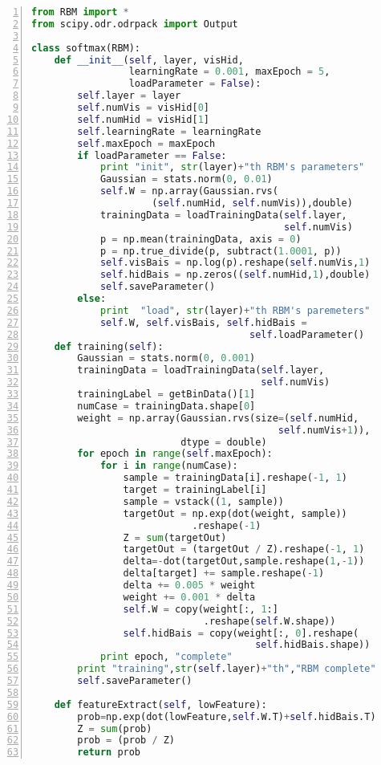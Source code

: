 \begin{lstlisting}[language=Python,numbers=left, frame=shadowbox, rulesepcolor=\color{cadegrey}, caption=\text{softmax.py}]
from RBM import *
from scipy.odr.odrpack import Output

class softmax(RBM): 
    def __init__(self, layer, visHid,
                 learningRate = 0.001, maxEpoch = 5,
                 loadParameter = False):
        self.layer = layer
        self.numVis = visHid[0]
        self.numHid = visHid[1]
        self.learningRate = learningRate
        self.maxEpoch = maxEpoch
        if loadParameter == False:
            print "init", str(layer)+"th RBM's parameters"
            Gaussian = stats.norm(0, 0.01)
            self.W = np.array(Gaussian.rvs(
                     (self.numHid, self.numVis)),double)                
            trainingData = loadTrainingData(self.layer,
                                            self.numVis)
            p = np.mean(trainingData, axis = 0)
            p = np.true_divide(p, subtract(1.0001, p))
            self.visBais = np.log(p).reshape(self.numVis,1)        
            self.hidBais = np.zeros((self.numHid,1),double)
            self.saveParameter()
        else:
            print  "load", str(layer)+"th RBM's paremeters"
            self.W, self.visBais, self.hidBais =
                                      self.loadParameter()    
    def training(self):
        Gaussian = stats.norm(0, 0.001)    
        trainingData = loadTrainingData(self.layer,
                                        self.numVis)
        trainingLabel = getBinData()[1]
        numCase = trainingData.shape[0]
        weight = np.array(Gaussian.rvs(size=(self.numHid, 
                                           self.numVis+1)), 
                          dtype = double)
        for epoch in range(self.maxEpoch):        
            for i in range(numCase):
                sample = trainingData[i].reshape(-1, 1)
                target = trainingLabel[i]
                sample = vstack((1, sample))
                targetOut = np.exp(dot(weight, sample))
                            .reshape(-1)
                Z = sum(targetOut)
                targetOut = (targetOut / Z).reshape(-1, 1)
                delta=-dot(targetOut,sample.reshape(1,-1))
                delta[target] += sample.reshape(-1)
                delta += 0.005 * weight
                weight += 0.001 * delta
                self.W = copy(weight[:, 1:]
                              .reshape(self.W.shape))
                self.hidBais = copy(weight[:, 0].reshape(
                                       self.hidBais.shape))            
            print epoch, "complete"
        print "training",str(self.layer)+"th","RBM complete"
        self.saveParameter()
    
    def featureExtract(self, lowFeature):       
        prob=np.exp(dot(lowFeature,self.W.T)+self.hidBais.T)
        Z = sum(prob)
        prob = (prob / Z)
        return prob
\end{lstlisting}

